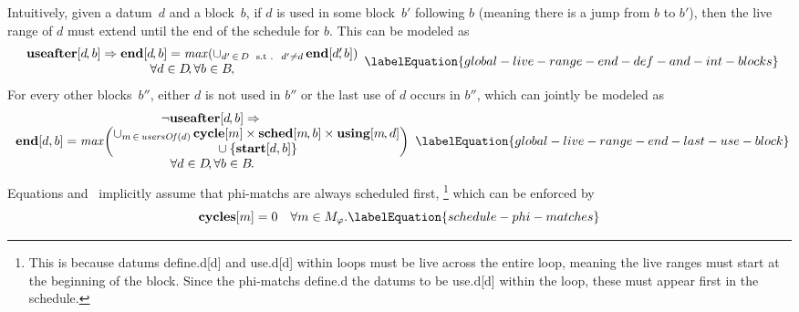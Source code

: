Intuitively, given a \gls{datum}~$d$ and a \gls{block}~$b$\hspace{-1pt}, if $d$
is used in some \gls{block}~$b'$ following $b$ (meaning there is a jump from $b$
to $b'$), then the \gls{live range} of $d$ must extend until the end of the
schedule for $b$\hspace{-1pt}.
%
This can be modeled as
%
\begin{equation}
  \begin{array}{c}
    \mVar{useafter}[d \hspace{-1pt}, b]
    \mImp
    \mVar{end}[d \hspace{-1pt}, b]
    =
    \mMax(
      \cup_{d' \,\in\, \mDataSet \text{ \st } d' \neq d} \,
      \mVar{end}[d' \!\!, b]
    ) \\
    \forall d \in \mDataSet \!,
    \forall b \in \mBlockSet \hspace{-1pt},
  \end{array}
  \labelEquation{global-live-range-end-def-and-int-blocks}
\end{equation}
%
For every other \glspl{block}~$b''\!$, either $d$ is not used in
$b''$ or the last use of $d$ occurs in $b''\!$, which can jointly be modeled as
%
\begin{equation}
  \begin{array}{c}
    \neg\mVar{useafter}[d \hspace{-1pt}, b]
    \mImp \mbox{} \\
    \mVar{end}[d, b]
    =
    \mMax\!
    \left(
      \begin{array}{@{}c@{}}
        \cup_{m \,\in\, \mUsersOf(d)} \,
        \mVar{cycle}[m]
        \times
        \mVar{sched}[m \hspace{-1pt}, b]
        \times
        \mVar{using}[m \hspace{-1pt}, d] \\
        \mbox{} \cup
        \mSet{\mVar{start}[d, b]}
      \end{array}
    \right) \\
    \forall d \in \mDataSet \!,
    \forall b \in \mBlockSet \hspace{-1pt}.
  \end{array}
  \labelEquation{global-live-range-end-last-use-block}
\end{equation}
%
Equations 
and~ implicitly assume that
\glspl{phi-match} are always scheduled first,%
%
\footnote{%
  This is because \glspl{datum} \gls{define.d}[d] and \gls{use.d}[d] within
  loops must be live across the entire loop, meaning the \glspl{live range} must
  start at the beginning of the \gls{block}.
  Since the \glspl{phi-match} \gls{define.d} the \glspl{datum} to be
  \gls{use.d}[d] within the loop, these must appear first in the schedule.
}
which can be enforced by
%
\begin{equation}
  \mVar{cycles}[m] = 0
  \mQuantSep
  \forall m \in \mPhiMatchSet.
  \labelEquation{schedule-phi-matches}
\end{equation}

